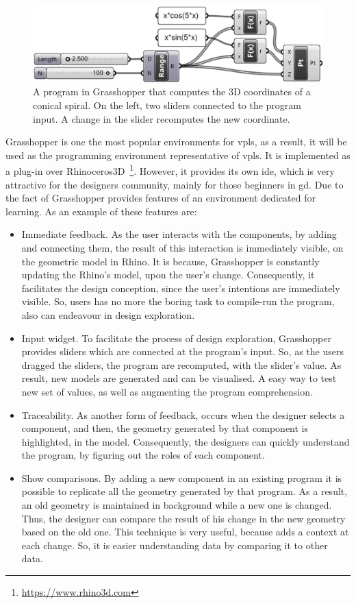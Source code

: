 \begin{figure}[h]
  \centering
  \includegraphics[scale=0.15]{img/grasshopper}
    \caption{A program in Grasshopper that computes the 3D coordinates of a conical spiral. On the left, two sliders connected to the program input. A change in the slider recomputes the new coordinate.}
  \label{fig:grass}
\end{figure}

Grasshopper is one the most popular environments for \ac{vpls}, as a result, it will be used as the programming environment representative of \ac{vpls}. It is implemented as a plug-in over Rhinoceros3D~\footnote{\url{https://www.rhino3d.com}}. However, it provides its own \ac{ide}, which is very attractive for the designers community, mainly for those beginners in \ac{gd}. Due to the fact of Grasshopper provides features of an environment dedicated for learning. As an example of these features are: 

\begin{itemize}
 \item Immediate feedback. As the user interacts with the components, by adding and connecting them, the result of this interaction is immediately visible, on the geometric model in Rhino.  It is because, Grasshopper is constantly updating the Rhino's model, upon the user's change. Consequently, it facilitates the design conception, since the user's intentions are immediately visible. So, users has no more the boring task to compile-run the program, also can endeavour in design exploration.
 \item Input widget. To facilitate the process of design exploration, Grasshopper provides sliders which are connected at the program's input. So, as the users dragged the sliders, the program are recomputed, with the slider's value. As result, new models are generated and can be visualised. A easy way to test new set of values, as well as augmenting the program comprehension.
 \item Traceability. As another form of feedback, occurs when the designer selects a component, and then, the geometry generated by that component is highlighted, in the model. Consequently, the designers can quickly understand the program, by figuring out the roles of each component.
 \item Show comparisons. By adding a new component in an existing program it is possible to replicate all the geometry generated by that program. As a result, an old geometry is maintained in background while a new one is changed. Thus, the designer can compare the result of his change in the new geometry based on the old one. This technique is very useful, because adds a context at each change. So, it is easier understanding data by comparing it to other data.
\end{itemize}

